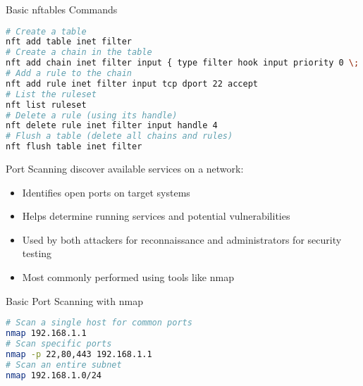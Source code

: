 \begin{code}{Basic nftables Commands}
\begin{lstlisting}[language=bash, style=basesmolll]
# Create a table
nft add table inet filter
# Create a chain in the table
nft add chain inet filter input { type filter hook input priority 0 \; policy drop \; }
# Add a rule to the chain
nft add rule inet filter input tcp dport 22 accept
# List the ruleset
nft list ruleset
# Delete a rule (using its handle)
nft delete rule inet filter input handle 4
# Flush a table (delete all chains and rules)
nft flush table inet filter
\end{lstlisting}
\end{code}



\begin{definition}{Port Scanning}
discover available services on a network:
\begin{itemize}
    \item Identifies open ports on target systems
    \item Helps determine running services and potential vulnerabilities
    \item Used by both attackers for reconnaissance and administrators for security testing
    \item Most commonly performed using tools like nmap
\end{itemize}
\end{definition}

\begin{examplecode}{Basic Port Scanning with nmap}
\begin{lstlisting}[language=bash, style=basesmolll]
# Scan a single host for common ports
nmap 192.168.1.1
# Scan specific ports
nmap -p 22,80,443 192.168.1.1
# Scan an entire subnet
nmap 192.168.1.0/24
\end{lstlisting}
\end{examplecode}





